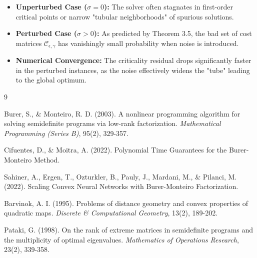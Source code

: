 \begin{itemize}
    \item \textbf{Unperturbed Case ($\sigma=0$):} The solver often stagnates in first-order critical points or narrow "tubular neighborhoods" of spurious solutions.
    \item \textbf{Perturbed Case ($\sigma > 0$):} As predicted by Theorem 3.5, the bad set of cost matrices $\mathcal{C}_{\epsilon,\gamma}$ has vanishingly small probability when noise is introduced. 
    \item \textbf{Numerical Convergence:} The criticality residual drops significantly faster in the perturbed instances, as the noise effectively widens the "tube" leading to the global optimum.
\end{itemize}

\begin{thebibliography}{9}

Burer, S., \& Monteiro, R. D. (2003). A nonlinear programming algorithm for solving semidefinite programs via low-rank factorization. \textit{Mathematical Programming (Series B)}, 95(2), 329-357.

Cifuentes, D., \& Moitra, A. (2022). Polynomial Time Guarantees for the Burer-Monteiro Method.

Sahiner, A., Ergen, T., Ozturkler, B., Pauly, J., Mardani, M., \& Pilanci, M. (2022). Scaling Convex Neural Networks with Burer-Monteiro Factorization.

Barvinok, A. I. (1995). Problems of distance geometry and convex properties of quadratic maps. \textit{Discrete \& Computational Geometry}, 13(2), 189-202.

Pataki, G. (1998). On the rank of extreme matrices in semidefinite programs and the multiplicity of optimal eigenvalues. \textit{Mathematics of Operations Research}, 23(2), 339-358.

\end{thebibliography}